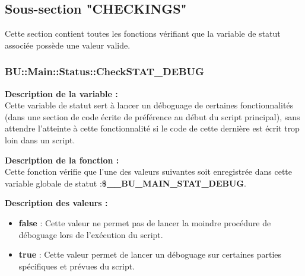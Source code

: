 \documentclass[a4paper,10pt]{article}
\begin{document}
\color{green}
\subsection{Sous-section "CHECKINGS"}\color{white}

\begin{justify}
    Cette section contient toutes les fonctions vérifiant que la variable de statut associée possède une valeur valide.
\end{justify}

\color{blue}
\subsubsection{\color{mauve}BU::Main::Status::CheckSTAT\_DEBUG}\color{white}

\begin{justify}
    \textbf{Description de la variable :}\\
    Cette variable de statut sert à lancer un déboguage de certaines fonctionnalités (dans une section de code écrite de préférence au début du script principal), sans attendre l'atteinte à cette fonctionnalité si le code de cette dernière est écrit trop loin dans un script.
\end{justify}

\begin{justify}
    \textbf{Description de la fonction :}\\
    Cette fonction vérifie que l'une des valeurs suivantes soit enregistrée dans cette variable globale de statut :\textbf{\color{orange}\$\_\_BU\_MAIN\_STAT\_DEBUG}.
\end{justify}

\begin{justify}
    \textbf{Description des valeurs :}

    \begin{itemize}
        \item \textbf{false} : Cette valeur ne permet pas de lancer la moindre procédure de déboguage lors de l'exécution du script.\\

        \item \textbf{true} : Cette valeur permet de lancer un déboguage sur certaines parties spécifiques et prévues du script.
    \end{itemize}

\end{justify}
\end{document}
